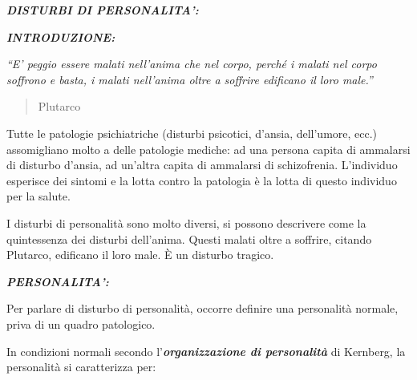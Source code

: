 \documentclass[]{article}
\date{}
\begin{document}
\textbf{\emph{DISTURBI DI PERSONALITA':}}

\textbf{\emph{INTRODUZIONE:}}

\emph{``E' peggio essere malati nell'anima che nel corpo, perché i
malati nel corpo soffrono e basta, i malati nell'anima oltre a soffrire
edificano il loro male.''}

\begin{quote}
Plutarco
\end{quote}

Tutte le patologie psichiatriche (disturbi psicotici, d'ansia,
dell'umore, ecc.) assomigliano molto a delle patologie mediche: ad una
persona capita di ammalarsi di disturbo d'ansia, ad un'altra capita di
ammalarsi di schizofrenia. L'individuo esperisce dei sintomi e la lotta
contro la patologia è la lotta di questo individuo per la salute.

I disturbi di personalità sono molto diversi, si possono descrivere come
la quintessenza dei disturbi dell'anima. Questi malati oltre a soffrire,
citando Plutarco, edificano il loro male. È un disturbo tragico.

\textbf{\emph{PERSONALITA':}}

Per parlare di disturbo di personalità, occorre definire una personalità
normale, priva di un quadro patologico.

In condizioni normali secondo l'\textbf{\emph{organizzazione di
personalità}} di Kernberg, la personalità si caratterizza per:
\end{document}
